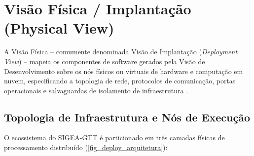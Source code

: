 \chapter{Visão Física / Implantação (Physical View)}
\label{cap_visao_fisica}

A Visão Física -- comumente denominada Visão de Implantação (\textit{Deployment View}) -- mapeia os componentes de software gerados pela Visão de Desenvolvimento sobre os nós físicos ou virtuais de hardware e computação em nuvem, especificando a topologia de rede, protocolos de comunicação, portas operacionais e salvaguardas de isolamento de infraestrutura \cite{kruchten1995,bass2021}.

\section{Topologia de Infraestrutura e Nós de Execução}
\label{sec_topologia_infraestrutura}

O ecossistema do SIGEA-GTT é particionado em três camadas físicas de processamento distribuído (\autoref{fig_deploy_arquitetura}):

